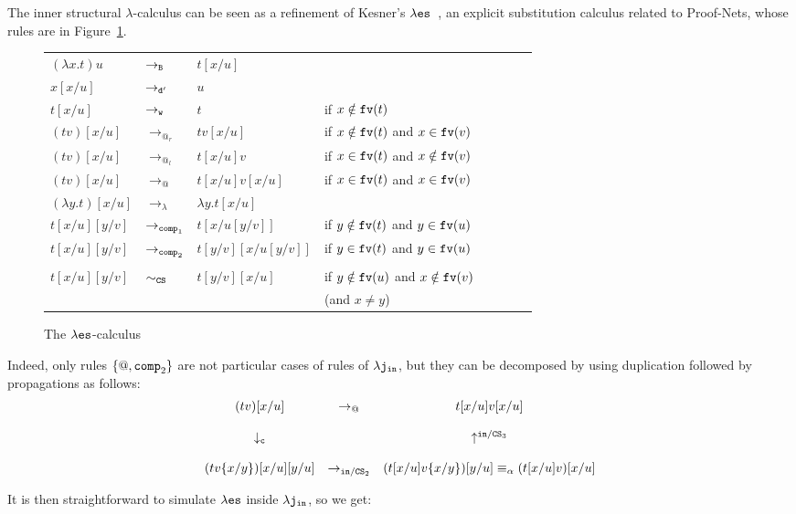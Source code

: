 \documentclass{LMCS}
\renewcommand{\>}{\rightarrow}
\def\lam{\lambda}
\newcommand{\Rew}[1]{\rightarrow_{#1}}
\newcommand{\es}{{\tt es}}
\newcommand{\les}{\lam \es}
\newcommand{\isubs}[1]{ \{ #1  \} }
\newcommand{\shB}{{\tt B}}
\newcommand{\dis}{{\tt j}}
\newcommand{\fv}[1]{{\tt fv}(#1)}
\newcommand{\Var}{{\tt d}}
\newcommand{\DSubs}{{\tt c}}
\newcommand{\iinn}{{\tt in}}
\newcommand{\ldisin}{\lam \dis_{\iinn}}
\newcommand{\Gc}{{\tt w}}
\newcommand{\CS}{{\tt CS}}
\newcommand{\set}[1]{ \{ #1 \}}
\newcommand{\modulo}[2]{#1/#2}
\newcommand{\eqw}[1]{\equiv_{#1}}
\newcommand{\inn}{\modulo{{\tt in}}{\CS}}
\newcommand{\comp}{{\tt comp}}
\begin{document}
\noindent The inner structural $\lam$-calculus can be seen as a refinement of
Kesner's $\les$~\cite{Kes07}, an explicit
substitution calculus related to Proof-Nets, whose rules are in
Figure~\ref{fig:les-rules}.

\begin{figure}
\begin{center}
 \begin{tabular}{llllllll}
$(\lambda x. t) u $&$\Rew{\shB}$& $t[x/u]$ \\
$ x [x/u]$&$\Rew{\Var'}$& $u$\\
$ t [x/u]$&$\Rew{\Gc}$& $t$  & if $x\notin\fv{t}$ \\
$  (t v) [x/u]$&$\Rew{@_r}$&$ t v [x/u]$ & if $x\notin\fv{t}$ and $x\in\fv{v}$\\
$  (t v) [x/u]$&$\Rew{@_l}$&$ t [x/u] v$ & if $x\in\fv{t}$ and $x\notin\fv{v}$\\
$  (t v) [x/u]$&$\Rew{@}$&$ t [x/u] v [x/u]$& if $x\in\fv{t}$ and $x\in\fv{v}$\\
$ (\lambda y. t) [x/u]$&$\Rew{\lam}$&$ \lambda y. t [x/u]$\\
$  t[x/u][y/v]$    & $\Rew{\comp_1} $& $t[x/u[y/v]]$  & if $y\notin\fv{t}$ and $y\in\fv{u}$\\
$  t[x/u][y/v]$    & $\Rew{\comp_2} $& $t[y/v][x/u[y/v]]$  & if $y\in\fv{t}$ and $y\in\fv{u}$\\\\
$  t[x/u][y/v]$ & $\sim_{\CS}$&$ t[y/v][x/u]$  & if $y\notin\fv{u}$ and $x\notin\fv{v}$ \\ &&&(and $x\neq y$)
\end{tabular}
\end{center}
\caption{The $\les$-calculus\label{fig:les-rules}}
\end{figure}

Indeed, only rules $\set{@,\comp_2}$ are not particular
cases of rules of $\ldisin$, but they can be decomposed 
by using duplication followed by propagations 
as follows:
\[\begin{array}{cccccccccc}
(t v) [x/u]&\Rew{@} &t [x/u] v [x/u]\\\\
\downarrow_\DSubs&& \uparrow^{\inn_3}\\\\
(t v\isubs{x/y}) [x/u][y/u]& \Rew{\inn_2}&(t[x/u] v\isubs{x/y}) [y/u]\eqw{\alpha}(t[x/u] v) [x/u]
\end{array}\]

It is then straightforward to simulate $\les$ inside $\ldisin$, so we get:
\end{document}
